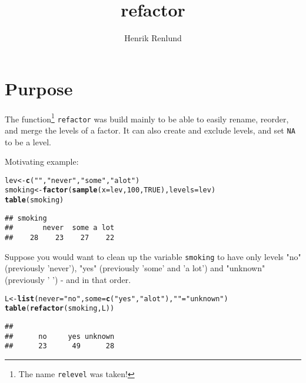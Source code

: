 \documentclass{article}\usepackage[]{graphicx}\usepackage[]{color}
\title{refactor}
\author{Henrik Renlund}
\makeatletter
\newcommand{\hlnum}[1]{\textcolor[rgb]{0.686,0.059,0.569}{#1}}%
\newcommand{\hlstr}[1]{\textcolor[rgb]{0.192,0.494,0.8}{#1}}%
\newcommand{\hlstd}[1]{\textcolor[rgb]{0.345,0.345,0.345}{#1}}%
\newcommand{\hlkwb}[1]{\textcolor[rgb]{0.69,0.353,0.396}{#1}}%
\newcommand{\hlkwc}[1]{\textcolor[rgb]{0.333,0.667,0.333}{#1}}%
\newcommand{\hlkwd}[1]{\textcolor[rgb]{0.737,0.353,0.396}{\textbf{#1}}}%
\newenvironment{kframe}{%
 \def\at@end@of@kframe{}%
 \ifinner\ifhmode%
  \def\at@end@of@kframe{\end{minipage}}%
  \begin{minipage}{\columnwidth}%
 \fi\fi%
 \def\FrameCommand##1{\hskip\@totalleftmargin \hskip-\fboxsep
 \colorbox{shadecolor}{##1}\hskip-\fboxsep
     \hskip-\linewidth \hskip-\@totalleftmargin \hskip\columnwidth}%
 \MakeFramed {\advance\hsize-\width
   \@totalleftmargin\z@ \linewidth\hsize
   \@setminipage}}%
 {\par\unskip\endMakeFramed%
 \at@end@of@kframe}
\newenvironment{knitrout}{}{} %
\newcommand{\code}{\texttt}
\makeatother
\begin{document}
\maketitle
\tableofcontents

\section{Purpose}
The function\footnote{The name \code{relevel} was taken!} \code{refactor} was build mainly to be able to easily rename, reorder, and merge the levels of a factor. It can also create and exclude levels, and set \code{NA} to be a level.

Motivating example:
\begin{knitrout}
\color{fgcolor}\begin{kframe}
\begin{alltt}
\hlstd{lev} \hlkwb{<-} \hlkwd{c}\hlstd{(}\hlstr{" "}\hlstd{,} \hlstr{"never"}\hlstd{,} \hlstr{"some"}\hlstd{,} \hlstr{"a lot"}\hlstd{)}
\hlstd{smoking} \hlkwb{<-} \hlkwd{factor}\hlstd{(}\hlkwd{sample}\hlstd{(}\hlkwc{x}\hlstd{=lev,} \hlnum{100}\hlstd{,} \hlnum{TRUE}\hlstd{),} \hlkwc{levels}\hlstd{=lev)}
\hlkwd{table}\hlstd{(smoking)}
\end{alltt}
\begin{verbatim}
## smoking
##       never  some a lot 
##    28    23    27    22
\end{verbatim}
\end{kframe}
\end{knitrout}
Suppose you would want to clean up the variable \code{smoking} to have only levels "no" (previously 'never'), "yes" (previously 'some' and 'a lot') and "unknown" (previously ' ')  - and in that order.
\begin{knitrout}
\color{fgcolor}\begin{kframe}
\begin{alltt}
\hlstd{L} \hlkwb{<-} \hlkwd{list}\hlstd{(}\hlkwc{never}\hlstd{=}\hlstr{"no"}\hlstd{,} \hlkwc{some}\hlstd{=}\hlkwd{c}\hlstd{(}\hlstr{"yes"}\hlstd{,} \hlstr{"a lot"}\hlstd{),} \hlstr{" "}\hlstd{=}\hlstr{"unknown"}\hlstd{)}
\hlkwd{table}\hlstd{(}\hlkwd{refactor}\hlstd{(smoking, L))}
\end{alltt}
\begin{verbatim}
## 
##      no     yes unknown 
##      23      49      28
\end{verbatim}
\end{kframe}
\end{knitrout}
\end{document}
